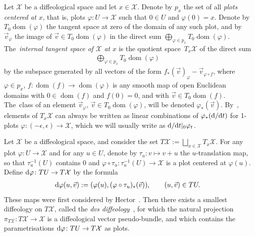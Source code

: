 \documentclass[10pt,a4paper]{amsart}
\numberwithin{equation}{section}
\def\dom{\operatorname{dom}}
\def\XX{{\mathcal{X}}}
\begin{document}
\begin{Definition}\label{tangentbundle}
Let $\XX$ be a diffeological space and let $x\in \XX$. Denote by $p_{x}$ the set of all \textit{plots centered at $x$}, that is, plots $\varphi\colon U\rightarrow \XX$ such that $0\in U$ and $\varphi(0) = x$. Denote by $T_{0}\dom(\varphi)$ the tangent space at zero of the domain of any such plot, and by $\vec{v}_{\varphi}$ the image of $\vec{v}\in T_{0}\dom(\varphi)$ in the direct sum $\bigoplus_{\varphi\in p_{x}}T_{0}\dom(\varphi)$. The~\textit{internal tangent space of $\XX$ at $x$} is the quotient space~$T_{x}\XX$ of the direct sum
\begin{gather*}
\bigoplus_{\varphi\in p_{x}} T_{0}\dom(\varphi)
\end{gather*}
by the subspace generated by all vectors of the form $f_{*}(\vec{v})_{\varphi} - \vec{v}_{\varphi\circ f}$, where $\varphi\in p_{x}$, $f\colon \dom(f)\rightarrow\dom(\varphi)$ is any smooth map of open Euclidean domains with $0\in\dom(f)$ and $f(0) = 0$, and with $\vec{v}\in T_{0}\dom(f)$. The~class of an element $\vec{v}_{\varphi}$, $\vec{v}\in T_{0}\dom(\varphi)$, will be denoted $\varphi_{*}(\vec{v})$. By~\cite[Proposition~3.3]{cw}, elements of $T_{x}\XX$ can always be written as linear combinations of $\varphi_{*}({\rm d}/{\rm d}t)$ for 1-plots $\varphi\colon (-\epsilon,\epsilon)\rightarrow\XX$, which we will usually write as ${\rm d}/{\rm d}t|_{0}\varphi_{t}$.
\end{Definition}

Let $\XX$ be a diffeological space, and consider the set $T\XX:=\bigsqcup_{x\in \XX}T_{x}\XX$. For any plot \mbox{$\varphi\colon U\rightarrow \XX$} and for any $u\in U$, denote by $\tau_{u}\colon v\mapsto v+u$ the $u$-translation map, so that $\tau_{u}^{-1}(U)$ contains $0$ and $\varphi\circ\tau_{u}\colon \tau_{u}^{-1}(U)\rightarrow \XX$ is a plot centered at $\varphi(u)$. Define ${\rm d}\varphi\colon TU\rightarrow T\XX$ by the formula
\begin{gather*}
{\rm d}\varphi(u,\vec{v}):=(\varphi(u),(\varphi\circ\tau_{u})_{*}(\vec{v})),\qquad (u,\vec{v})\in TU.
\end{gather*}
These maps were first considered by Hector~\cite{hector}. Then there exists a smallest diffeology on $T\XX$, called the \textit{dvs diffeology}~\cite{cw}, for which the natural projection $\pi_{T\XX}\colon T\XX\rightarrow \XX$ is a diffeological vector pseudo-bundle, and which contains the parametrisations ${\rm d}\varphi\colon TU\rightarrow T\XX$ as plots.
\end{document}
